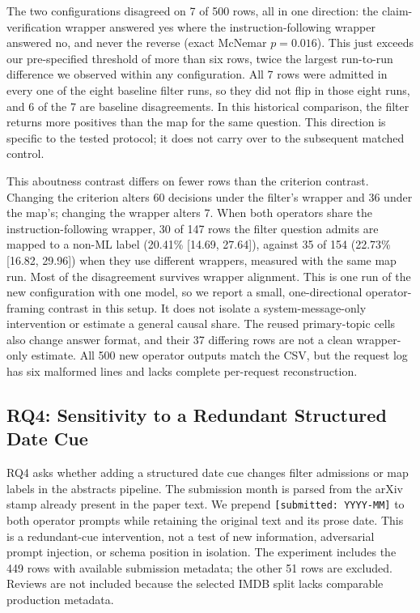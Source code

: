\documentclass[11pt]{article}
\begin{document}
The two configurations disagreed on 7 of 500 rows, all in one direction: the
claim-verification wrapper answered yes where the instruction-following
wrapper answered no, and never the reverse (exact McNemar $p = 0.016$). This
just exceeds our pre-specified threshold of more than six rows, twice the
largest run-to-run difference we observed within any configuration. All 7
rows were admitted in every one of the eight baseline filter runs, so they
did not flip in those eight runs, and 6 of the 7 are baseline disagreements.
In this historical comparison, the filter returns more positives than the
map for the same question. This direction is specific to the tested protocol;
it does not carry over to the subsequent matched control.

This aboutness contrast differs on fewer rows than the criterion contrast. Changing the criterion
alters 60 decisions under the filter's wrapper and 36 under the map's;
changing the wrapper alters 7. When both operators share the
instruction-following wrapper, 30 of 147 rows the filter question admits are
mapped to a non-ML label (20.41\% [14.69, 27.64]), against 35 of 154
(22.73\% [16.82, 29.96]) when they use different wrappers, measured with the
same map run. Most of the disagreement survives wrapper alignment. This is
one run of the new configuration with one model, so we report a small,
one-directional operator-framing contrast in this setup. It does not
isolate a system-message-only intervention or estimate a general causal
share. The reused primary-topic cells also change answer format, and their
37 differing rows are not a clean wrapper-only estimate. All 500 new operator
outputs match the CSV, but the request log has six malformed lines and lacks
complete per-request reconstruction.

\subsection{RQ4: Sensitivity to a Redundant Structured Date Cue}
\label{sec:rq4}

RQ4 asks whether adding a structured date cue changes filter admissions or
map labels in the abstracts pipeline. The submission month is parsed from
the arXiv stamp already present in the paper text. We prepend
\texttt{[submitted: YYYY-MM]} to both operator prompts while retaining the
original text and its prose date. This is a redundant-cue intervention, not
a test of new information, adversarial prompt injection, or schema position
in isolation. The experiment includes the 449 rows with available submission
metadata; the other 51 rows are excluded. Reviews are not included because
the selected IMDB split lacks comparable production metadata.
\end{document}
